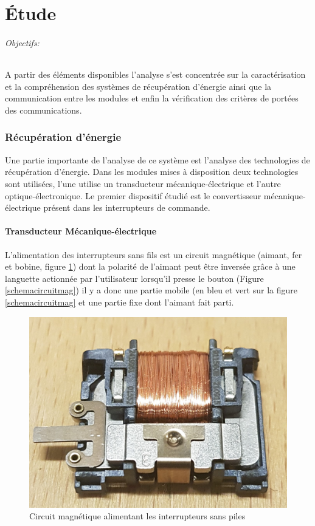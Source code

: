 \documentclass{rapportENS}
\begin{document}
 
\part{Étude}
 \paragraph{Objectifs:}  A partir des éléments disponibles l'analyse s'est concentrée sur la caractérisation et la compréhension des systèmes de récupération d'énergie ainsi que la communication entre les modules et enfin la vérification des critères de portées des communications.
 
 \section{Récupération d'énergie}
 Une partie importante de l'analyse de ce système est l'analyse des technologies de récupération d'énergie. Dans les modules mises à disposition deux technologies sont utilisées, l'une utilise un transducteur mécanique-électrique et l'autre optique-électronique. Le premier dispositif étudié est le convertisseur mécanique-électrique présent dans les interrupteurs de commande.
 
 \subsection{Transducteur Mécanique-électrique}
 
 L'alimentation des interrupteurs sans fils est un circuit magnétique (aimant, fer et bobine, figure \ref{photocircuitmag}) dont la polarité de l'aimant peut être inversée grâce à une languette actionnée par l'utilisateur lorsqu'il presse le bouton (Figure \ref{schemacircuitmag}) il y a donc une partie mobile (en bleu et vert sur la figure \ref{schemacircuitmag} et une partie fixe dont l'aimant fait parti.
 
 \vspace{0.5cm}
 
\begin{figure}[h!]
 \includegraphics[width = .3\linewidth]{circuitmag.jpg}
 \centering
 \vspace{0.2cm}
 \caption{Circuit magnétique alimentant les interrupteurs sans piles}
 \label{photocircuitmag}
\end{figure}
 \vspace{0.5cm}
 
\end{document}
